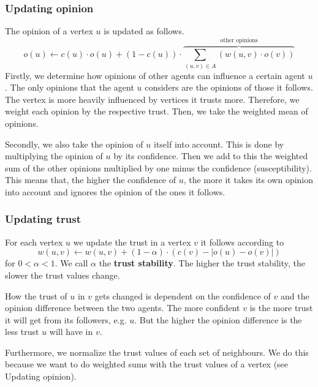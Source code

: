 \documentclass[11pt]{article}
\begin{document}
\subsubsection{Updating opinion}
The opinion of a vertex \(u\) is updated as follows.
\[o(u)\leftarrow c(u)\cdot o(u) + (1-c(u))\cdot\overbrace{\sum\limits_{(u,v)\in A}\left(w(u,v)\cdot o(v)\right)}^{\textrm{other opinions}}\]
Firstly, we determine how opinions of other agents can influence a certain agent \(u\). The only opinions that the agent \(u\) considers are the opinions of those it follows. The vertex is more heavily influenced by vertices it trusts more. Therefore, we weight each opinion by the respective trust. Then, we take the weighted mean of opinions.\par
Secondly, we also take the opinion of \(u\) itself into account. This is done by multiplying the opinion of \(u\) by its confidence. Then we add to this the weighted sum of the other opinions multiplied by one minus the confidence (susceptibility). This means that, the higher the confidence of \(u\), the more it takes its own opinion into account and ignores the opinion of the ones it follows.

\subsubsection{Updating trust}
For each vertex \(u\) we update the trust in a vertex \(v\) it follows according to
\[w(u,v)\leftarrow w(u,v) + (1-\alpha)\cdot \left(c(v)-|o(u)-o(v)|\right)\] for \(0<\alpha<1\). We call \(\alpha\) the \textbf{trust stability}. The higher the trust stability, the slower the trust values change.\par
How the trust of \(u\) in \(v\) gets changed is dependent on the confidence of \(v\) and the opinion difference between the two agents. The more confident \(v\) is the more trust it will get from its followers, e.g. \(u\). But the higher the opinion difference is the less trust \(u\) will have in \(v\).\par
Furthermore, we normalize the trust values of each set of neighbours. We do this because we want to do weighted sums with the trust values of a vertex (see Updating opinion).
\end{document}
